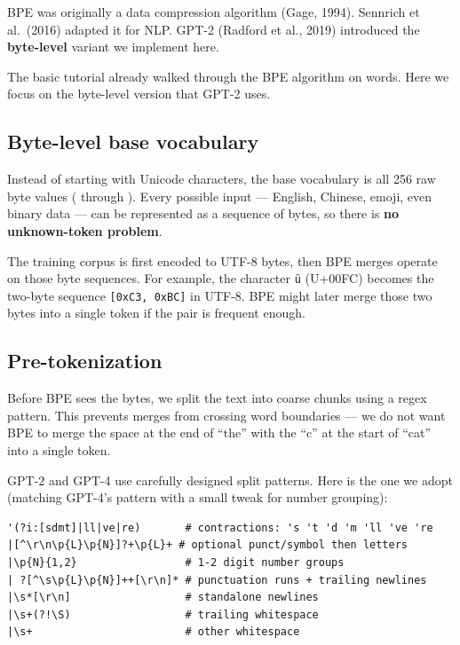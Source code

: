 BPE was originally a data compression algorithm (Gage, 1994).  Sennrich et al.\ (2016) adapted it for NLP.  GPT-2 (Radford et al., 2019) introduced the \textbf{byte-level} variant we implement here.

The basic tutorial already walked through the BPE algorithm on words.  Here we focus on the byte-level version that GPT-2 uses.

\subsection{Byte-level base vocabulary}

Instead of starting with Unicode characters, the base vocabulary is all 256 raw byte values ( through ).  Every possible input --- English, Chinese, emoji, even binary data --- can be represented as a sequence of bytes, so there is \textbf{no unknown-token problem}.

The training corpus is first encoded to UTF-8 bytes, then BPE merges operate on those byte sequences.  For example, the character \texttt{\"u} (U+00FC) becomes the two-byte sequence \texttt{[0xC3, 0xBC]} in UTF-8.  BPE might later merge those two bytes into a single token if the pair is frequent enough.

\subsection{Pre-tokenization}

Before BPE sees the bytes, we split the text into coarse chunks using a regex pattern.  This prevents merges from crossing word boundaries --- we do not want BPE to merge the space at the end of ``the'' with the ``c'' at the start of ``cat'' into a single token.

GPT-2 and GPT-4 use carefully designed split patterns.  Here is the one we adopt (matching GPT-4's pattern with a small tweak for number grouping):

\concepttag
\begin{lstlisting}[language={},basicstyle=\ttfamily\footnotesize]
'(?i:[sdmt]|ll|ve|re)       # contractions: 's 't 'd 'm 'll 've 're
|[^\r\n\p{L}\p{N}]?+\p{L}+ # optional punct/symbol then letters
|\p{N}{1,2}                 # 1-2 digit number groups
| ?[^\s\p{L}\p{N}]++[\r\n]* # punctuation runs + trailing newlines
|\s*[\r\n]                  # standalone newlines
|\s+(?!\S)                  # trailing whitespace
|\s+                        # other whitespace
\end{lstlisting}

